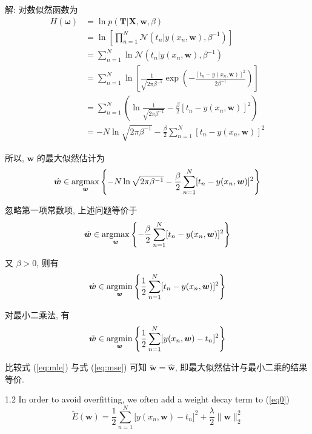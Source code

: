 \documentclass{article}
\begin{document}
解: 对数似然函数为
\begin{equation}
  \begin{aligned}
    H(\bm{\omega})
    &=\ln p(\bm{T}|\bm{X},\bm{w},\beta)\\
    &=\ln\left[\prod_{n=1}^N \mathcal{N}(t_n|y(x_n,\bm{w}),\beta^{-1})\right]\\
    &=\sum_{n=1}^N\ln\mathcal{N}(t_n|y(x_n,\bm{w}),\beta^{-1})\\
    &=\sum_{n=1}^N\ln\left[\frac{1}{\sqrt{2\pi\beta^{-1}}}\exp\left(-\frac{[t_n-y(x_n,\bm{w})]^2}{2\beta^{-1}}\right)\right]\\
    &=\sum_{n=1}^N\left(\ln\frac{1}{\sqrt{2\pi\beta^{-1}}}-\frac{\beta}{2}[t_n-y(x_n,\bm{w})]^2\right)\\
    &=-N\ln\sqrt{2\pi\beta^{-1}}-\frac{\beta}{2}\sum_{n=1}^N[t_n-y(x_n,\bm{w})]^2
  \end{aligned}
\end{equation}

所以, $\bm{w}$ 的最大似然估计为
\begin{equation}
  \hat{\bm{w}}\in\operatorname*{argmax}_{\bm{w}}\left\{-N\ln\sqrt{2\pi\beta^{-1}}-\frac{\beta}{2}\sum_{n=1}^N[t_n-y(x_n,\bm{w})]^2\right\}
\end{equation}

忽略第一项常数项, 上述问题等价于
\begin{equation}
  \hat{\bm{w}}\in\operatorname*{argmax}_{\bm{w}}\left\{-\frac{\beta}{2}\sum_{n=1}^N[t_n-y(x_n,\bm{w})]^2\right\}
\end{equation}

又 $\beta>0$, 则有
\begin{equation}
  \label{eq:mle}
  \hat{\bm{w}}\in\operatorname*{argmin}_{\bm{w}}\left\{\frac{1}{2}\sum_{n=1}^N[t_n-y(x_n,\bm{w})]^2\right\}
\end{equation}

对最小二乘法, 有
\begin{equation}
  \label{eq:mse}
  \tilde{\bm{w}}\in\operatorname*{argmin}_{\bm{w}}\left\{\frac{1}{2}\sum_{n=1}^N[y(x_n,\bm{w})-t_n]^2\right\}
\end{equation}

比较式 (\ref{eq:mle}) 与式 (\ref{eq:mse}) 可知 $\tilde{\bm{w}}=\hat{\bm{w}}$, 即最大似然估计与最小二乘的结果等价.

1.2 In order to avoid overfitting, we often add a weight decay term to (\ref{eq0})
\begin{equation}
  \label{eq1}
  \tilde{E}(\bm{w})=\frac{1}{2}\sum_{n=1}^N\big[y(x_n,\bm{w})-t_n\big]^2
  +\frac{\lambda}{2} \|\bm{w}\|_2^2
\end{equation}
\end{document}
